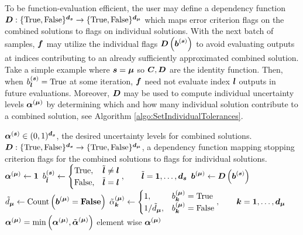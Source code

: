 \documentclass{article}[12pt]
\begin{document}
To be function-evaluation efficient, the user may define a dependency function $\bD: \tfset^{\bd_{\bs}} \to \tfset^{\bd_{\bmu}}$ which maps error criterion flags on the combined solutions to flags on individual solutions. With the next batch of samples, $\bf$ may utilize the individual flags $\bD\left(\bb^{(\bs)}\right)$ to avoid evaluating outputs at indices contributing to an already sufficiently approximated combined solution. Take a simple example where  $\bs=\bmu$ so $\bC,\bD$ are the identity function. Then, when $b^{(\bs)}_{\bl}=\True$ at some iteration, $\bf$ need not evaluate index ${\bl}$ outputs in future evaluations. Moreover, $\bD$ may be used to compute individual uncertainty levels $\balpha^{(\bmu)}$ by determining which and how many individual solution contribute to a combined solution, see Algorithm \ref{algo:SetIndividualTolerances}.

\begin{algorithm}[h!]
    \caption{$\texttt{SetIndividualTolerances}(\balpha^{(\bs)},\bD)$}
    \label{algo:SetIndividualTolerances}
    \begin{algorithmic}
    \Require $\balpha^{(\bs)} \in (0,1)^{\bd_{\bs}}$, the desired uncertainty levels for combined solutions. 
    \Require $\bD: \tfset^{\bd_{\bs}} \to \tfset^{\bd_{\bmu}}$, a dependency function mapping stopping criterion flags for the combined solutions to flags for individual solutions. \\
    \hrulefill
    \State $\balpha^{(\bmu)} \gets \boldsymbol{1}$
     
        \State $b^{(\bs)}_{\tilde{\bl}} \gets \begin{cases} \True, & \tilde{\bl} \neq \bl \\ \False, & \tilde{\bl} = \bl \end{cases}, \qquad \tilde{\bl}=\boldsymbol{1},\dots,\bd_{\bs}$
        \State $\bb^{(\bmu)} \gets \bD\left(\bb^{(\bs)}\right)$
        \State $\tilde{d}_{\bmu} \gets \text{Count}\left(\bb^{(\bmu)}=\textbf{\False}\right)$
        \State $\tilde{\alpha}_{\bk}^{(\bmu)} \gets \begin{cases} 1, & b^{(\bmu)}_{\bk} = \True \\ 1/\tilde{d}_{\bmu}, & b^{(\bmu)}_{\bk} = \False \end{cases}, \qquad \bk=\boldsymbol{1},\dots,\bd_{\bmu}$
        \State $\balpha^{(\bmu)} = \min\left(\balpha^{(\bmu)},\tilde{\balpha}^{(\bmu)}\right)$ element wise 
    \EndFor
    \State \Return $\balpha^{(\bmu)}$
    \end{algorithmic}
\end{algorithm}
\end{document}
